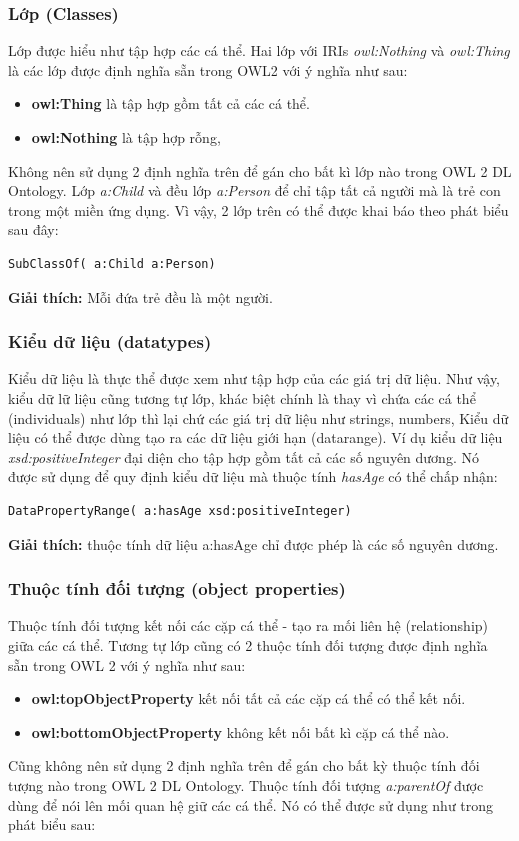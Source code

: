 \subsubsection{Lớp (Classes)}
Lớp được hiểu như tập hợp các cá thể. Hai lớp với IRIs \textit{owl:Nothing} và \textit{owl:Thing} là các lớp được định nghĩa sẵn trong OWL2 với ý nghĩa như sau:
\begin{itemize}
\item \textbf{owl:Thing} là tập hợp gồm tất cả các cá thể.
\item \textbf{owl:Nothing} là tập hợp rỗng,
\end{itemize}
Không nên sử dụng 2 định nghĩa trên để gán cho bất kì lớp nào trong OWL 2 DL Ontology. Lớp \textit{a:Child} và đều lớp \textit{a:Person} để chỉ tập tất cả người mà là trẻ con trong một miền ứng dụng. Vì vậy, 2 lớp trên có thể được khai báo theo phát biểu sau đây:

\begin{verbatim}
SubClassOf( a:Child a:Person) 
\end{verbatim}

\textbf{Giải thích:} Mỗi đứa trẻ đều là một người.

\subsubsection{Kiểu dữ liệu (datatypes)}
Kiểu dữ liệu là thực thể được xem như tập hợp của các giá trị dữ liệu. Như vậy, kiểu dữ lữ liệu cũng tương tự lớp, khác biệt chính là thay vì chứa các cá thể (individuals) như lớp thì lại chứ các giá trị dữ liệu như strings, numbers, Kiểu dữ liệu có thể được dùng tạo ra các dữ liệu giới hạn (datarange). Ví dụ kiểu dữ liệu \textit{xsd:positiveInteger} đại diện cho tập hợp gồm tất cả các số nguyên dương. Nó được sử dụng để quy định kiểu dữ liệu mà thuộc tính \textit{hasAge} có thể chấp nhận:

\begin{verbatim}
DataPropertyRange( a:hasAge xsd:positiveInteger) 
\end{verbatim}

\textbf{Giải thích:} thuộc tính dữ liệu a:hasAge chỉ được phép là các số nguyên dương.

\subsubsection{Thuộc tính đối tượng (object properties)} 
Thuộc tính đối tượng kết nối các cặp cá thể - tạo ra mối liên hệ (relationship) giữa các cá thể. Tương tự lớp cũng có 2 thuộc tính đối tượng được định nghĩa sẵn trong OWL 2 với ý nghĩa như sau:
\begin{itemize}
\item \textbf{owl:topObjectProperty} kết nối tất cả các cặp cá thể có thể kết nối.
\item \textbf{owl:bottomObjectProperty} không kết nối bất kì cặp cá thể nào. 
\end{itemize}
Cũng không nên sử dụng 2 định nghĩa trên để gán cho bất kỳ thuộc tính đối tượng nào trong OWL 2 DL Ontology. Thuộc tính đối tượng \textit{a:parentOf} được dùng để nói lên mối quan hệ giữ các cá thể. Nó có thể được sử dụng như trong phát biểu sau:

